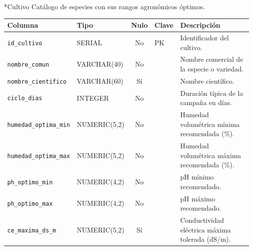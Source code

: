 \documentclass[11pt,letterpaper]{article}
\makeatletter
\renewcommand\subsubsection{\@startsection{subsubsection}{3}{\z@}{-3.25ex\@plus -1ex \@minus -.2ex}{1.5ex \@plus .2ex}{\normalfont\normalsize\bfseries}}
\makeatother
\begin{document}
\subsubsection*{Cultivo}
Catálogo de especies con sus rangos agronómicos óptimos.
{\footnotesize
\begin{longtable}{>{\raggedright\arraybackslash}p{3.3cm}>{\raggedright\arraybackslash}p{2.5cm}c>{\raggedright\arraybackslash}p{2.2cm}>{\raggedright\arraybackslash}p{6.1cm}}
\toprule
\textbf{Columna} & \textbf{Tipo} & \textbf{Nulo} & \textbf{Clave} & \textbf{Descripción} \\
\midrule
\endhead
\texttt{id\_cultivo} & SERIAL & No & PK & Identificador del cultivo. \\
\texttt{nombre\_comun} & VARCHAR(40) & No &  & Nombre comercial de la especie o variedad. \\
\texttt{nombre\_cientifico} & VARCHAR(60) & Sí &  & Nombre científico. \\
\texttt{ciclo\_dias} & INTEGER & No &  & Duración típica de la campaña en días. \\
\texttt{humedad\_optima\_min} & NUMERIC(5,2) & No &  & Humedad volumétrica mínima recomendada (\%). \\
\texttt{humedad\_optima\_max} & NUMERIC(5,2) & No &  & Humedad volumétrica máxima recomendada (\%). \\
\texttt{ph\_optimo\_min} & NUMERIC(4,2) & No &  & pH mínimo recomendado. \\
\texttt{ph\_optimo\_max} & NUMERIC(4,2) & No &  & pH máximo recomendado. \\
\texttt{ce\_maxima\_ds\_m} & NUMERIC(5,2) & Sí &  & Conductividad eléctrica máxima tolerada (dS/m). \\
\bottomrule
\end{longtable}}
\medskip
\end{document}
